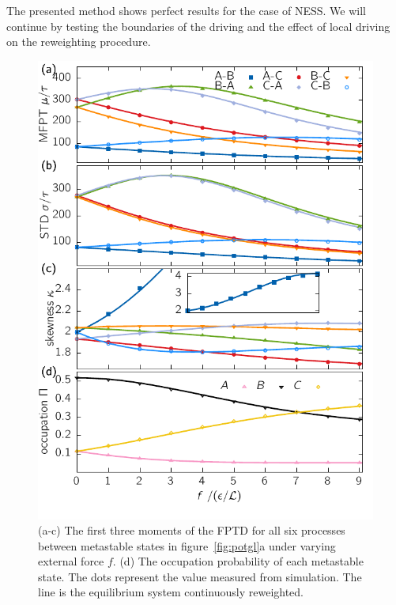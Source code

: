 The presented method shows perfect results for the case of NESS. We will continue by testing the boundaries of the driving and the effect of local driving on the reweighting procedure. 

\begin{figure}
\centering
 \includegraphics{../plots/Urew/mom_2010.pdf}
 \caption[The first three moments and the population of metastable states for the 1D driven system for varying external force.]{(a-c) The first three moments of the FPTD for all six processes between metastable states in figure~\ref{fig:potgl}a under varying external force $f$. (d) The occupation probability of each metastable state. The dots represent the value measured from simulation. The line is the equilibrium system continuously reweighted.  }
 \label{fig:momgl}
\end{figure}
\FloatBarrier

